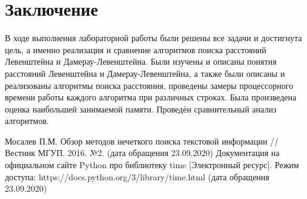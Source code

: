 \documentclass[12pt,a4paper]{report}
\begin{document}
\newpage
\chapter*{Заключение}

В ходе выполнения лабораторной работы были решены все задачи и достигнута цель, а именно реализация и 
сравнение алгоритмов поиска расстояний Левенштейна и Дамерау-Левенштейна. Были изучены и описаны понятия 
расстояний Левенштейна и Дамерау-Левенштейна, а также были описаны и реализованы алгоритмы поиска 
расстояния, проведены замеры процессорного времени работы каждого алгоритма при различных строках. Была 
произведена оценка наибольшей занимаемой памяти. Проведён сравнительный анализ алгоритмов.

\renewcommand\bibname{Список литературы}
\makeatletter %
\def\@biblabel#1{#1. }
\makeatother
\begin{thebibliography}{2}
     Мосалев П.М. Обзор методов нечеткого поиска текстовой информации // Вестник МГУП. 2016. №2. (дата обращения 23.09.2020)
     Документация на официальном сайте Python про библиотеку time [Электронный ресурс]. Режим доступа: https://docs.python.org/3/library/time.html (дата обращения 23.09.2020)
\end{thebibliography}
\end{document}
